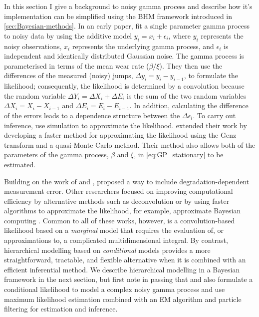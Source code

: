 In this section I give a background to noisy gamma process and describe how it's implementation can be simplified using the BHM framework introduced in \ref{sec:Bayesian-methods}. In an early paper, \citet{kallen_optimal_2005} fit a single parameter gamma process to noisy data by using the additive model $y_i = x_i + \epsilon_i$, where $y_i$ represents the noisy observations, $x_i$ represents the underlying gamma process, and $\epsilon_i$ is independent and identically distributed Gaussian noise. The gamma process is parameterised in terms of the mean wear rate ($\beta / \xi $). They then use the differences of the measured (noisy) jumps, $\Delta y_i = y_i - y_{i-1}$, to formulate the likelihood; consequently, the likelihood is determined by a convolution because the random variable $\Delta Y_i = \Delta X_i + \Delta E_i$ is the sum of the two random variables $\Delta X_i = X_i - X_{i-1}$ and $\Delta E_i = E_i - E_{i-1}$. In addition, calculating the difference of the errors leads to a dependence structure between the $\Delta \epsilon_i$. To carry out inference, \citet{kallen_optimal_2005} use simulation to approximate the likelihood. \citet{lu_efficient_2013} extended their work by developing a faster method for approximating the likelihood using the Genz transform and a quasi-Monte Carlo method. Their method also allows both of the parameters of the gamma process, $\beta$ and $\xi$, in \ref{eq:GP_stationary} to be estimated.

Building on the work of \citet{kallen_optimal_2005} and \citet{lu_efficient_2013}, \citet{pulcini_perturbed_2016} proposed a way to include degradation-dependent measurement error. Other researchers focused on improving computational efficiency by alternative methods such as deconvolution \citep{rodriguez-picon_reliability_2021} or by using  faster algorithms to approximate the likelihood, for example, approximate Bayesian computing \citep{hazra_approximate_2020, hazra_likelihood-free_2022}. Common to all of these works, however, is a convolution-based likelihood based on a \emph{marginal} model that requires the evaluation of, or approximations to, a complicated multidimensional integral. By contrast, hierarchical modelling based on \emph{conditional} models provides a more straightforward, tractable, and flexible alternative when it is combined with an efficient inferential method. We describe hierarchical modelling in a Bayesian framework in the next section, but first note in passing that \citet{giorgio_perturbed_2019} and \citet{esposito_new_2022} also formulate a conditional likelihood to model a complex noisy gamma process and use maximum likelihood estimation combined with an EM algorithm and particle filtering for estimation and inference.

